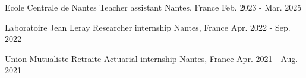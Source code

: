 

\begin{cvcompactentries}

\cvcompactentry
{Ecole Centrale de Nantes} %
{Teacher assistant} %
{Nantes, France} %
{Feb. 2023 - Mar. 2025} %
{}

\cvcompactentry
{Laboratoire Jean Leray} %
{Researcher internship} %
{Nantes, France} %
{Apr. 2022 - Sep. 2022} %
{}

\cvcompactentry
  {Union Mutualiste Retraite} %
  {Actuarial internship} %
  {Nantes, France} %
  {Apr. 2021 - Aug. 2021} %
  {}

\end{cvcompactentries}
